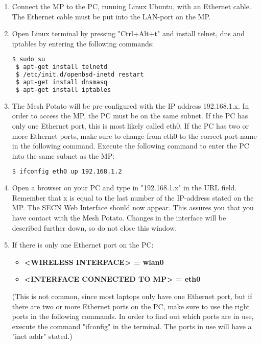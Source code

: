 

\begin{enumerate}
\item Connect the MP to the PC, running Linux Ubuntu, with an Ethernet cable. The Ethernet cable must be put into the LAN-port on the MP. 

\item Open Linux terminal by pressing "Ctrl+Alt+t" and install telnet, dns and iptables by entering the following commands: 
\noindent
\begin{lstlisting}[language=bash]
 $ sudo su
 $ apt-get install telnetd
 $ /etc/init.d/openbsd-inetd restart 
 $ apt-get install dnsmasq
 $ apt-get install iptables
\end{lstlisting}

\item The Mesh Potato will be pre-configured with the IP address 192.168.1.x. In order to access the MP, the PC must be on the same subnet. If the PC has only one Ethernet port, this is most likely called eth0. If the PC has two or more Ethernet ports, make sure to change from eth0 to the correct port-name in the following command. Execute the following command to enter the PC into the same subnet as the MP: 
\noindent
\begin{lstlisting}[language=bash]
  $ ifconfig eth0 up 192.168.1.2
\end{lstlisting}

\item Open a browser on your PC and type in "192.168.1.x" in the URL field. Remember that x is equal to the last number of the IP-address stated on the MP. The SECN Web Interface should now appear. This assures you that you have contact with the Mesh Potato. Changes in the interface will be described further down, so do not close this window.  

\item  
If there is only one Ethernet port on the PC:
\begin{itemize} 
\item [] \textbf{<WIRELESS INTERFACE> = wlan0}
\item [] \textbf{<INTERFACE CONNECTED TO MP> = eth0}
\end{itemize}

(This is not common, since most laptops only have one Ethernet port, but if there are two or more Ethernet ports on the PC, make sure to use the right ports in the following commands. In order to find out which ports are in use, execute the command "ifconfig" in the terminal. The ports in use will have a "inet addr" stated.) 


\end{enumerate}
